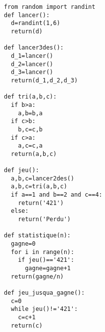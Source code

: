 \documentclass[a4paper, 11pt,reqno]{article}
\begin{document}
\begin{correction}


\begin{lstlisting}
from random import randint
def lancer():
  d=randint(1,6)
  return(d)

def lancer3des():
  d_1=lancer()
  d_2=lancer()
  d_3=lancer()
  return(d_1,d_2,d_3)
  
def tri(a,b,c):
  if b>a:
    a,b=b,a
  if c>b:
    b,c=c,b
  if c>a:
    a,c=c,a
  return(a,b,c)

def jeu():
  a,b,c=lancer2des()
  a,b,c=tri(a,b,c)
  if a==1 and b==2 and c==4:
    return('421')
  else:
    return('Perdu')

def statistique(n):
  gagne=0
  for i in range(n):
    if jeu()=='421':
      gagne=gagne+1
  return(gagne/n)

def jeu_jusqua_gagne():
  c=0
  while jeu()!='421':
    c=c+1
  return(c)

\end{lstlisting}

\end{correction}
\end{document}
